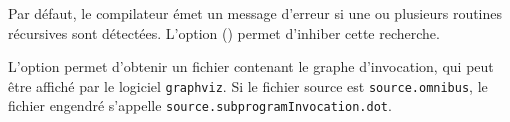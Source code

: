 
Par défaut, le compilateur émet un message d'erreur si une ou plusieurs routines récursives sont détectées. L'option  () permet d'inhiber cette recherche.

L'option  permet d'obtenir un fichier contenant le graphe d'invocation, qui peut être affiché par le logiciel \texttt{graphviz}. Si le fichier source est \texttt{source.omnibus}, le fichier engendré s'appelle \texttt{source.subprogramInvocation.dot}.

